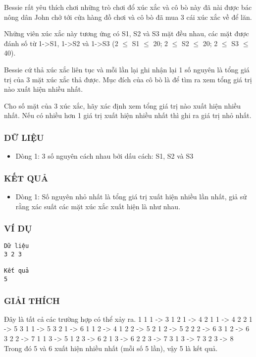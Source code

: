 



   Bessie rất yêu thích chơi những trò chơi đổ xúc xắc và cô bò này đã nài được bác nông dân John chở tới cửa hàng đồ chơi và cô bò đã mua 3 cái xúc xắc về để lăn.  

   Những viên xúc xắc này tương ứng có S1, S2 và S3 mặt đều nhau, các mặt được đánh  số từ 1->S1, 1->S2 và 1->S3 (2  $\le$  S1  $\le$  20; 2  $\le$  S2  $\le$  20; 2  $\le$  S3  $\le$  40).  

   Bessie cứ thả xúc xắc liên tục và mỗi lần lại ghi nhận lại 1 số nguyên là tổng giá trị  của 3 mặt xúc xắc thả được. Mục đích của cô bò là để tìm ra xem tổng giá trị nào  xuất hiện nhiều nhất.  

   Cho số mặt của 3 xúc xắc, hãy xác định xem tổng giá trị nào xuất hiện nhiều nhất. Nếu có nhiều hơn 1 giá trị xuất hiện nhiều nhất thì ghi ra giá trị nhỏ nhất.  

\subsubsection{   DỮ LIỆU  }
\begin{itemize}
	\item     Dòng 1: 3 số nguyên cách nhau bởi dấu cách: S1, S2 và S3   
\end{itemize}

\subsubsection{   KẾT QUẢ  }
\begin{itemize}
	\item     Dòng 1: Số nguyên nhỏ nhất là tổng giá trị xuất hiện nhiều lần nhất, giả sử rằng         xác suất các mặt xúc xắc xuất hiện là như nhau.   
\end{itemize}

\subsubsection{   VÍ DỤ  }
\begin{verbatim}
Dữ liệu
3 2 3

Kết quả
5
\end{verbatim}

\subsubsection{   GIẢI THÍCH  }

   Đây là tất cả các trường hợp có thể xảy ra. 1 1 1 -> 3  1 2 1 -> 4  2 1 1 -> 4  2 2 1 -> 5  3 1 1 -> 5  3 2 1 -> 6 1 1 2 -> 4  1 2 2 -> 5  2 1 2 -> 5  2 2 2 -> 6  3 1 2 -> 6  3 2 2 -> 7 1 1 3 -> 5  1 2 3 -> 6  2 1 3 -> 6  2 2 3 -> 7  3 1 3 -> 7  3 2 3 -> 8 Trong đó 5 và 6 xuất hiện nhiều nhất (mỗi số 5 lần), vậy 5 là kết quả.  
